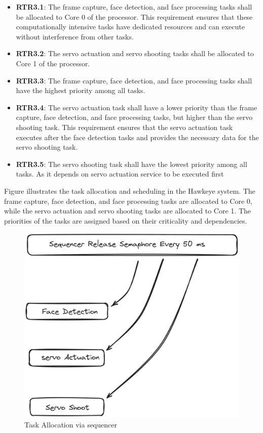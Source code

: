 \documentclass[a4paper,11pt]{article}%
\begin{document}
\begin{itemize}
    \item \textbf{RTR3.1}: The frame capture, face detection, and face processing tasks shall be allocated to Core 0 of the processor. This requirement ensures that these computationally intensive tasks have dedicated resources and can execute without interference from other tasks.
    \item \textbf{RTR3.2}: The servo actuation and servo shooting tasks shall be allocated to Core 1 of the processor.
    \item \textbf{RTR3.3}: The frame capture, face detection, and face processing tasks shall have the highest priority among all tasks.
    \item \textbf{RTR3.4}: The servo actuation task shall have a lower priority than the frame capture, face detection, and face processing tasks, but higher than the servo shooting task. This requirement ensures that the servo actuation task executes after the face detection tasks and provides the necessary data for the servo shooting task.
    \item \textbf{RTR3.5}: The servo shooting task shall have the lowest priority among all tasks. As it depends on servo actuation service to be executed first
\end{itemize}
Figure illustrates the task allocation and scheduling in the Hawkeye system. The frame capture, face detection, and face processing tasks are allocated to Core 0, while the servo actuation and servo shooting tasks are allocated to Core 1. The priorities of the tasks are assigned based on their criticality and dependencies.
\begin{figure}[H]
    \centering
    \includegraphics[scale=0.25]{figures/task_allocation.png}
    \caption{Task Allocation via sequencer}
\end{figure}
\end{document}

